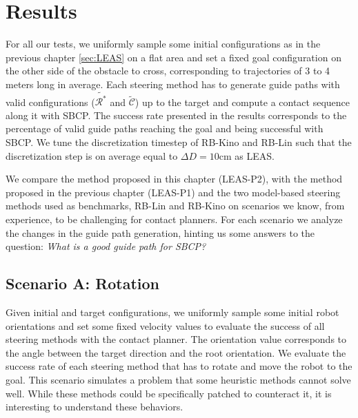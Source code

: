 \section{Results\label{sub:cp-sb:results}}

For all our tests, we uniformly sample some initial configurations as in the previous chapter \ref{sec:LEAS} on a flat area and set a fixed goal configuration on the other side of the obstacle to cross, corresponding to trajectories of 3 to 4 meters long in average.
Each steering method has to generate guide paths with valid configurations ($\tilde{\mathcal{R}^*}$ and $\tilde{\mathcal{C}}$) up to the target and compute a contact sequence along it with SBCP.
The success rate presented in the results corresponds to the percentage of valid guide paths reaching the goal and being successful with SBCP.
We tune the discretization timestep of RB-Kino and RB-Lin such that the discretization step is on average equal to $\Delta D=10$cm as LEAS.

We compare the method proposed in this chapter (LEAS-P2), with the method proposed in the previous chapter (LEAS-P1) and the two model-based steering methods used as benchmarks, RB-Lin and RB-Kino on scenarios we know, from experience, to be challenging for contact planners. For each scenario we analyze the changes in the guide path generation, hinting us some answers to the question: \textit{What is a good guide path for SBCP?}

\subsection{Scenario A: Rotation\label{subsub:sbcp:rotation}}
Given initial and target configurations, we uniformly sample some initial robot orientations and set some fixed velocity values to evaluate the success of all steering methods with the contact planner. The orientation value corresponds to the angle between the target direction and the root orientation. 
We evaluate the success rate of each steering method that has to rotate and move the robot to the goal. 
This scenario simulates a problem that some heuristic methods cannot solve well. While these methods could be specifically patched to counteract it, it is interesting to understand these behaviors.

